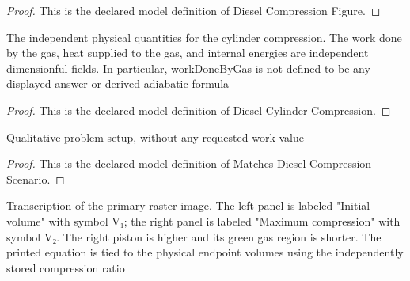 \begin{proof}
  This is the declared model definition of Diesel Compression Figure.
\end{proof}
\begin{definition}
  \label{def:physics:phyx-mini-0472:phyxminiproblems-problemphyxmini0472-dieselcylindercompression}
  The independent physical quantities for the cylinder compression. The work done by the gas, heat supplied to the gas, and internal energies are independent dimensionful fields. In particular, workDoneByGas is not defined to be any displayed answer or derived adiabatic formula
\end{definition}
\begin{proof}
  This is the declared model definition of Diesel Cylinder Compression.
\end{proof}
\begin{definition}
  \label{def:physics:phyx-mini-0472:phyxminiproblems-problemphyxmini0472-matchesdieselcompressionscenario}
  Qualitative problem setup, without any requested work value
\end{definition}
\begin{proof}
  This is the declared model definition of Matches Diesel Compression Scenario.
\end{proof}
\begin{definition}
  \label{def:physics:phyx-mini-0472:phyxminiproblems-problemphyxmini0472-matchesprimarycompressionfigure}
  Transcription of the primary raster image. The left panel is labeled "Initial volume" with symbol V₁; the right panel is labeled "Maximum compression" with symbol V₂. The right piston is higher and its green gas region is shorter. The printed equation is tied to the physical endpoint volumes using the independently stored compression ratio
\end{definition}
